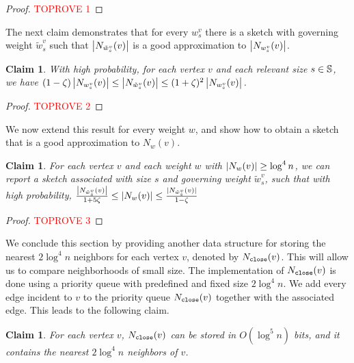 \documentclass{article}
\newtheorem{claim}[theorem]{Claim}
\begin{document}
\begin{proof}\textcolor{red}{TOPROVE 1}\end{proof}

The next claim demonstrates that for every $w^v_s$ there is a sketch with governing weight $\tilde{w}^v_s$ such that $\left|N_{\tilde{w}^v_s}(v)\right|$ is a good approximation to $\left|N_{w^v_s}(v)\right|$.

\begin{claim}
\label{clm:sketch1nb}
With high probability, for each vertex \(v\) and each relevant size \(s \in \mathbb{S} \), we have \( (1-\zeta)\left|N_{w^v_s}(v)\right| \leq \left|N_{\tilde{w}^v_s}(v)\right| \leq (1+\zeta)^2\left|N_{w^v_s}(v)\right| \).
\end{claim}

\begin{proof}\textcolor{red}{TOPROVE 2}\end{proof}

We now extend this result for every weight $w$, and show how to obtain a sketch that is a good approximation to $N_w(v)$.

\begin{claim}\label{clm:sketch1nb2}
For each vertex \(v\) and each weight $w$ with $\left|N_w(v)\right| \geq \log^4 n$, we can report a sketch associated with size $s$ and governing weight $\tilde{w}^v_s$, such that with high probability, 
$\frac{\left|N_{\tilde{w}^v_{s}}(v)\right|}{1+5\zeta} \leq |N_{w}(v)| \leq \frac{|N_{\tilde{w}^v_s}(v)|}{1-\zeta}$
\end{claim}

\begin{proof}\textcolor{red}{TOPROVE 3}\end{proof}

\vspace{3mm}
\noindent

We conclude this section by providing another data structure for storing the nearest \(2\log^4 n\) neighbors for each vertex $v$, denoted by \(N_{\texttt{close}}(v)\). This will allow us to compare neighborhoods of small size.
The implementation of \(N_{\texttt{close}}(v)\) is done using a priority queue with predefined and fixed size \(2\log^4 n\). We add every edge incident to $v$ to the priority queue \(N_{\texttt{close}}(v)\) together with the associated edge. This leads to the following claim.

\begin{claim}
\label{clm:sketch3}
 For each vertex \(v\), \(N_{\texttt{close}}(v)\) can be stored in \(O(\log^5 n)\) bits, and it contains the nearest \(2\log^4 n\) neighbors of \(v\).
\end{claim}
\end{document}
